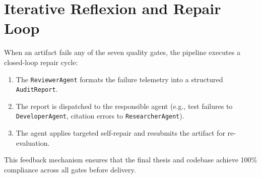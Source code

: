 \section{Iterative Reflexion and Repair Loop}
\label{sec:repair_loop}

When an artifact fails any of the seven quality gates, the pipeline executes a closed-loop repair cycle:
\begin{enumerate}
    \item The \texttt{ReviewerAgent} formats the failure telemetry into a structured \texttt{AuditReport}.
    \item The report is dispatched to the responsible agent (e.g., test failures to \texttt{DeveloperAgent}, citation errors to \texttt{ResearcherAgent}).
    \item The agent applies targeted self-repair and resubmits the artifact for re-evaluation.
\end{enumerate}
This feedback mechanism ensures that the final thesis and codebase achieve 100\% compliance across all gates before delivery.

